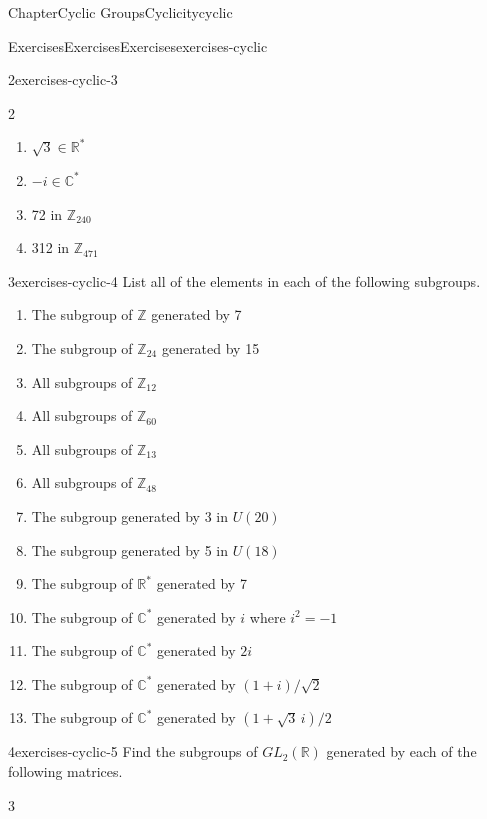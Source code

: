 \documentclass[oneside,10pt,]{book}
\numberwithin{equation}{section}
\begin{document}
\begin{chapterptx}{Chapter}{Cyclic Groups}{}{Cyclicity}{}{}{cyclic}
\begin{exercises-section}{Exercises}{Exercises}{}{Exercises}{}{}{exercises-cyclic}
\begin{divisionexercise}{2}{}{}{exercises-cyclic-3}
\begin{multicols}{2}
\begin{enumerate}[label={(\alph*)}]
\item{}\(\displaystyle \sqrt{3} \in {\mathbb R}^\ast\)%
\item{}\(\displaystyle -i \in {\mathbb C}^\ast\)%
\item{}72 in \({\mathbb Z}_{240}\)%
\item{}312 in \({\mathbb Z}_{471}\)%
\end{enumerate}
\end{multicols}
\end{divisionexercise}%
\begin{divisionexercise}{3}{}{}{exercises-cyclic-4}%
List all of the elements in each of the following subgroups.%
%
\begin{enumerate}[label={(\alph*)}]
\item{}The subgroup of \({\mathbb Z}\) generated by 7%
\item{}The subgroup of \({\mathbb Z}_{24}\) generated by 15%
\item{}All subgroups of \({\mathbb Z}_{12}\)%
\item{}All subgroups of \({\mathbb Z}_{60}\)%
\item{}All subgroups of \({\mathbb Z}_{13}\)%
\item{}All subgroups of \({\mathbb Z}_{48}\)%
\item{}The subgroup generated by 3  in \(U(20)\)%
\item{}The subgroup generated by 5 in \(U(18)\)%
\item{}The subgroup of \({\mathbb R}^\ast\) generated by 7%
\item{}The subgroup of \({\mathbb C}^\ast\) generated by \(i\) where \(i^2 = -1\)%
\item{}The subgroup of \({\mathbb C}^\ast\) generated by \(2i\)%
\item{}The subgroup of \({\mathbb C}^\ast\) generated by \((1 + i) / \sqrt{2}\)%
\item{}The subgroup of \({\mathbb C}^\ast\) generated by \((1 + \sqrt{3}\, i) / 2\)%
\end{enumerate}
\end{divisionexercise}%
\begin{divisionexercise}{4}{}{}{exercises-cyclic-5}%
Find the subgroups of \(GL_2( {\mathbb R })\) generated by each of the following matrices.%
%
\begin{multicols}{3}
\begin{enumerate}[label={(\alph*)}]
\item{}\(\displaystyle \displaystyle \begin{pmatrix}

\end{pmatrix}
\end{enumerate}
\end{multicols}
\end{divisionexercise}
\end{exercises-section}
\end{chapterptx}
\end{document}

